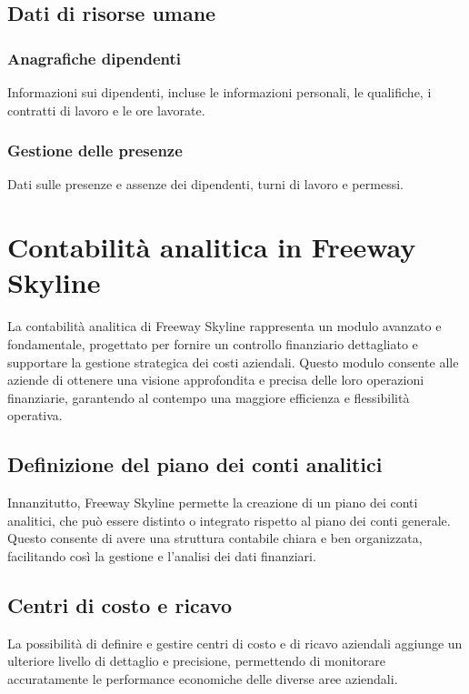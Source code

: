 \documentclass{article}
\begin{document}
\subsection{Dati di risorse umane}
\subsubsection{Anagrafiche dipendenti}
Informazioni sui dipendenti, incluse le informazioni personali, le qualifiche, i contratti di lavoro e le ore lavorate.
\subsubsection{Gestione delle presenze}
Dati sulle presenze e assenze dei dipendenti, turni di lavoro e permessi.

\section{Contabilità analitica in Freeway Skyline}

La contabilità analitica di Freeway Skyline rappresenta un modulo avanzato e fondamentale, progettato per fornire un controllo finanziario dettagliato e supportare la gestione strategica dei costi aziendali. Questo modulo consente alle aziende di ottenere una visione approfondita e precisa delle loro operazioni finanziarie, garantendo al contempo una maggiore efficienza e flessibilità operativa.

\subsection{Definizione del piano dei conti analitici}

Innanzitutto, Freeway Skyline permette la creazione di un piano dei conti analitici, che può essere distinto o integrato rispetto al piano dei conti generale. Questo consente di avere una struttura contabile chiara e ben organizzata, facilitando così la gestione e l'analisi dei dati finanziari.

\subsection{Centri di costo e ricavo}

La possibilità di definire e gestire centri di costo e di ricavo aziendali aggiunge un ulteriore livello di dettaglio e precisione, permettendo di monitorare accuratamente le performance economiche delle diverse aree aziendali.
\end{document}

